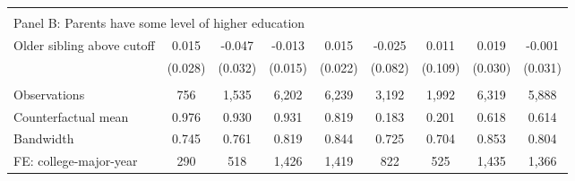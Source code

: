 {{\begin{tabular}{lcccccccc}
&  &  &  & & & & & &    \\
\multicolumn{9}{l}{Panel B: Parents have some level of higher education} \\
Older sibling above cutoff&       0.015   &      -0.047   &      -0.013   &       0.015   &      -0.025   &       0.011   &       0.019   &      -0.001   \\
                    &     (0.028)   &     (0.032)   &     (0.015)   &     (0.022)   &     (0.082)   &     (0.109)   &     (0.030)   &     (0.031)   \\
                    &               &               &               &               &               &               &               &               \\
Observations        &         756   &       1,535   &       6,202   &       6,239   &       3,192   &       1,992   &       6,319   &       5,888   \\
Counterfactual mean &       0.976   &       0.930   &       0.931   &       0.819   &       0.183   &       0.201   &       0.618   &       0.614   \\
Bandwidth           &       0.745   &       0.761   &       0.819   &       0.844   &       0.725   &       0.704   &       0.853   &       0.804   \\
FE: college-major-year&         290   &         518   &       1,426   &       1,419   &         822   &         525   &       1,435   &       1,366   \\
 

\bottomrule
\end{tabular}
}
}
